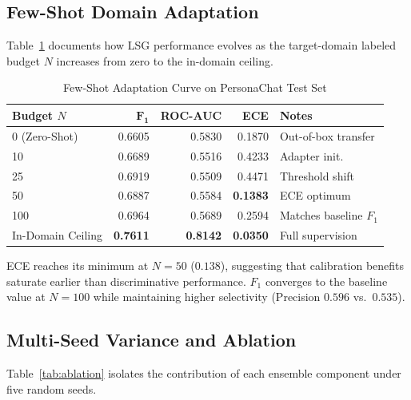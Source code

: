 \documentclass[conference]{IEEEtran}
\begin{document}
\subsection{Few-Shot Domain Adaptation}
Table~\ref{tab:fewshot} documents how LSG performance
evolves as the target-domain labeled budget $N$ increases
from zero to the in-domain ceiling.

\begin{table}[h!]
  \centering
  \caption{Few-Shot Adaptation Curve on PersonaChat Test Set}
  \label{tab:fewshot}
  \renewcommand{\arraystretch}{1.2}
  \begin{tabular}{@{}lrrrp{2.4cm}@{}}
    \toprule
    \textbf{Budget $N$} & $\bm{F_1}$ & \textbf{ROC-AUC} & \textbf{ECE} & \textbf{Notes} \\
    \midrule
    0 (Zero-Shot)     & 0.6605 & 0.5830 & 0.1870 & Out-of-box transfer \\
    10                & 0.6689 & 0.5516 & 0.4233 & Adapter init. \\
    25                & 0.6919 & 0.5509 & 0.4471 & Threshold shift \\
    50                & 0.6887 & 0.5584 & \textbf{0.1383} & ECE optimum \\
    100               & 0.6964 & 0.5689 & 0.2594 & Matches baseline $F_1$ \\
    In-Domain Ceiling & \textbf{0.7611} & \textbf{0.8142} & \textbf{0.0350} & Full supervision \\
    \bottomrule
  \end{tabular}
\end{table}

\noindent ECE reaches its minimum at $N{=}50$ ($0.138$),
suggesting that calibration benefits saturate earlier than
discriminative performance.
$F_1$ converges to the baseline value at $N{=}100$ while
maintaining higher selectivity (Precision $0.596$ vs.\
$0.535$).

\subsection{Multi-Seed Variance and Ablation}
Table~\ref{tab:ablation} isolates the contribution of each
ensemble component under five random seeds.
\end{document}
